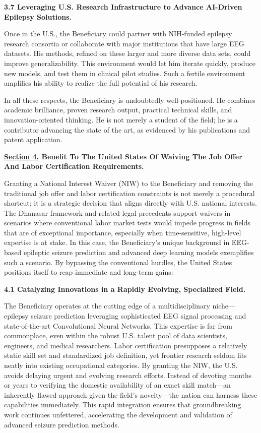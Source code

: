 \documentclass{article}
\begin{document}
{\bf 3.7 Leveraging U.S. Research Infrastructure to Advance AI-Driven Epilepsy Solutions.}

Once in the U.S., the Beneficiary could partner with NIH-funded epilepsy research consortia or collaborate with major institutions that have large EEG datasets. His methods, refined on these larger and more diverse data sets, could improve generalizability. This environment would let him iterate quickly, produce new models, and test them in clinical pilot studies. Such a fertile environment amplifies his ability to realize the full potential of his research.

In all these respects, the Beneficiary is undoubtedly well-positioned. He combines academic brilliance, proven research output, practical technical skills, and innovation-oriented thinking. He is not merely a student of the field; he is a contributor advancing the state of the art, as evidenced by his publications and patent application.


\clearpage

{\bf \underline{Section 4.} Benefit To The United States Of Waiving The Job Offer And Labor Certification Requirements. }

Granting a National Interest Waiver (NIW) to the Beneficiary and removing the traditional job offer and labor certification constraints is not merely a procedural shortcut; it is a strategic decision that aligns directly with U.S. national interests. The Dhanasar framework and related legal precedents support waivers in scenarios where conventional labor market tests would impede progress in fields that are of exceptional importance, especially when time-sensitive, high-level expertise is at stake. In this case, the Beneficiary’s unique background in EEG-based epileptic seizure prediction and advanced deep learning models exemplifies such a scenario. By bypassing the conventional hurdles, the United States positions itself to reap immediate and long-term gains:

{\bf 4.1 Catalyzing Innovations in a Rapidly Evolving, Specialized Field.}

The Beneficiary operates at the cutting edge of a multidisciplinary niche—epilepsy seizure prediction leveraging sophisticated EEG signal processing and state-of-the-art Convolutional Neural Networks. This expertise is far from commonplace, even within the robust U.S. talent pool of data scientists, engineers, and medical researchers. Labor certification presupposes a relatively static skill set and standardized job definition, yet frontier research seldom fits neatly into existing occupational categories. By granting the NIW, the U.S. avoids delaying urgent and evolving research efforts. Instead of devoting months or years to verifying the domestic availability of an exact skill match—an inherently flawed approach given the field’s novelty—the nation can harness these capabilities immediately. This rapid integration ensures that groundbreaking work continues unfettered, accelerating the development and validation of advanced seizure prediction methods.
\end{document}
